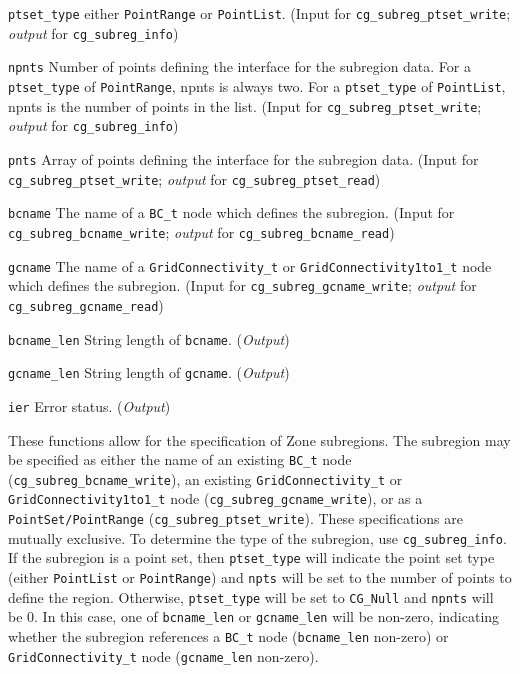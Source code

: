 \begin{Ventryi}{\texttt{ptset\_type}}
      either \texttt{PointRange} or \texttt{PointList}.
      (\textcolor{input}{Input} for \texttt{cg\_subreg\_ptset\_write};
      \textcolor{output}{\textit{output}} for
      \texttt{cg\_subreg\_info})
\item [\texttt{npnts}]
      Number of points defining the interface for the subregion data.
      For a \texttt{ptset\_type} of \texttt{PointRange}, npnts
      is always two. For a \texttt{ptset\_type} of \texttt{PointList},
      npnts is the number of points in the list. 
      (\textcolor{input}{Input} for \texttt{cg\_subreg\_ptset\_write};
      \textcolor{output}{\textit{output}} for
      \texttt{cg\_subreg\_info})
\item [\texttt{pnts}]
      Array of points defining the interface for the subregion data.
      (\textcolor{input}{Input} for \texttt{cg\_subreg\_ptset\_write};
      \textcolor{output}{\textit{output}} for
      \texttt{cg\_subreg\_ptset\_read})
\item [\texttt{bcname}]
      The name of a \texttt{BC\_t} node which defines the subregion.
      (\textcolor{input}{Input} for \texttt{cg\_subreg\_bcname\_write};
      \textcolor{output}{\textit{output}} for
      \texttt{cg\_subreg\_bcname\_read})
\item [\texttt{gcname}]
      The name of a \texttt{GridConnectivity\_t} or
      \texttt{GridConnectivity1to1\_t} node which defines the subregion.
      (\textcolor{input}{Input} for \texttt{cg\_subreg\_gcname\_write};
      \textcolor{output}{\textit{output}} for
      \texttt{cg\_subreg\_gcname\_read})
\item [\texttt{bcname\_len}]
      String length of \texttt{bcname}.
      (\textcolor{output}{\textit{Output}})
\item [\texttt{gcname\_len}]
      String length of \texttt{gcname}.
      (\textcolor{output}{\textit{Output}})
\item [\texttt{ier}]
      Error status.
      (\textcolor{output}{\textit{Output}})
\end{Ventryi}

These functions allow for the specification of Zone subregions. The
subregion may be specified as either the name of an existing
\texttt{BC\_t} node (\texttt{cg\_subreg\_bcname\_write}), an
existing \texttt{GridConnectivity\_t} or \texttt{GridConnectivity1to1\_t}
node (\texttt{cg\_subreg\_gcname\_write}), or as a
\texttt{PointSet/PointRange} (\texttt{cg\_subreg\_ptset\_write}).
These specifications are mutually exclusive.
To determine the type of the subregion, use
\texttt{cg\_subreg\_info}. If the subregion is a point set,
then \texttt{ptset\_type} will indicate the point set type (either
\texttt{PointList} or \texttt{PointRange}) and \texttt{npts} will be
set to the number of points to define the region. Otherwise,
\texttt{ptset\_type} will be set to \texttt{CG\_Null} and
\texttt{npnts} will be 0. In this case, one of \texttt{bcname\_len}
or \texttt{gcname\_len} will be non-zero, indicating whether the
subregion references a \texttt{BC\_t} node
(\texttt{bcname\_len} non-zero) or
\texttt{GridConnectivity\_t} node (\texttt{gcname\_len} non-zero).

